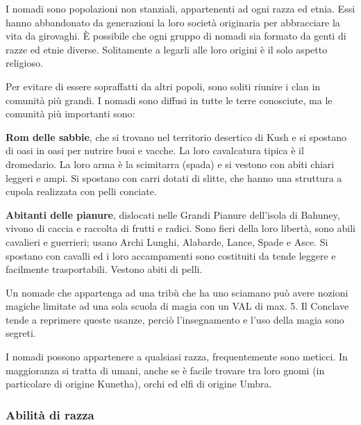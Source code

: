 
I nomadi sono popolazioni non stanziali, appartenenti ad ogni razza ed
etnia.  Essi hanno abbandonato da generazioni la loro societ\`a
originaria per abbracciare la vita da girovaghi. \`E possibile che
ogni gruppo di nomadi sia formato da genti di razze ed etnie diverse.
Solitamente a legarli alle loro origini \`e il solo aspetto religioso.

Per evitare di essere sopraffatti da altri popoli, sono soliti riunire
i clan in comunit\`a pi\`u grandi.  I nomadi sono diffusi in tutte le
terre conosciute, ma le comunit\`a pi\`u importanti sono:

\begin{description}
\item{\textbf{Rom delle sabbie},} che si trovano nel territorio desertico di
  Kush e si spostano di oasi in oasi per nutrire buoi e vacche. La
  loro cavalcatura tipica \`e il dromedario.  La loro arma \`e la
  scimitarra (spada) e si vestono con abiti chiari leggeri e ampi. Si
  spostano con carri dotati di slitte, che hanno una struttura a
  cupola realizzata con pelli conciate.
  
\item{\textbf{Abitanti delle pianure},} dislocati nelle Grandi Pianure
  dell'isola di Bahuney, vivono di caccia e raccolta di frutti e
  radici. Sono fieri della loro libert\`a, sono abili cavalieri e
  guerrieri; usano Archi Lunghi, Alabarde, Lance, Spade e Asce.
  Si spostano con cavalli ed i loro accampamenti sono costituiti da
  tende leggere e facilmente trasportabili. Vestono abiti di pelli.

\end{description}

Un nomade che appartenga ad una trib\`u che ha uno sciamano pu\`o
avere nozioni magiche limitate ad una sola scuola di magia con un VAL
di max. 5. Il Conclave tende a reprimere queste usanze, perci\`o
l'insegnamento e l'uso della magia sono segreti.

\Fisico I nomadi possono appartenere a qualsiasi razza, frequentemente
sono meticci. In maggioranza si tratta di umani, anche se \`e facile
trovare tra loro gnomi (in particolare di origine Kunetha), orchi ed
elfi di origine Umbra.

\subsubsection{Abilit\`a di razza}

